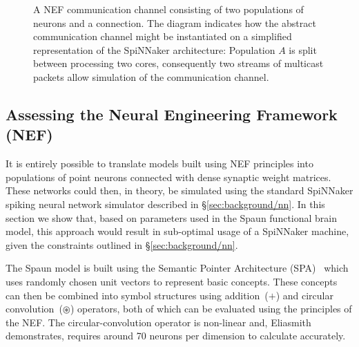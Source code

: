 \documentclass[conference]{IEEEtran}
\begin{document}
  \begin{figure}
    \centering
    
    \caption{A NEF communication channel consisting of two populations of neurons and a connection.
    The diagram indicates how the abstract communication channel might be instantiated on a simplified representation of the SpiNNaker architecture:
    Population $A$ is split between processing two cores, consequently two streams of multicast packets allow simulation of the communication channel.
    }
    \label{fig:background/comms-channel}
  \end{figure}
  
  \subsection{Assessing the Neural Engineering Framework (NEF)}
  \label{sec:background/assessing}

It is entirely possible to translate models built using NEF principles into populations of point neurons connected with dense synaptic weight matrices.
These networks could then, in theory, be simulated using the standard SpiNNaker spiking neural network simulator described in \S\ref{sec:background/nn}.
In this section we show that, based on parameters used in the Spaun functional brain model, this approach would result in sub-optimal usage of a SpiNNaker machine, given the constraints outlined in \S\ref{sec:background/nn}.

The Spaun model is built using the Semantic Pointer Architecture (SPA)~\parencite{eliasmith2013build} which uses randomly chosen unit vectors to represent basic concepts.
These concepts can then be combined into symbol structures using addition~($+$) and circular convolution~($\circledast$) operators, both of which can be evaluated using the principles of the NEF.
The circular-convolution operator is non-linear and, Eliasmith~\parencite{eliasmith2013build} demonstrates, requires around 70 neurons per dimension to calculate accurately.
\end{document}

